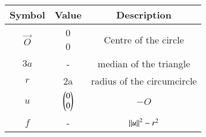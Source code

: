 \begin{tabular}[12pt]{ |c|c|c|}
    \hline
	\textbf{Symbol} & \textbf{Value} & \textbf{Description}\\
    \hline
	$\vec{O}$ &\myvec{0 \\ 0} & Centre of the circle\\
    \hline 
	$3a$ &- & median of the triangle \\
    \hline
	$r$ & 2a & radius of the circumcircle \\
    \hline
	$u$ & $\begin{pmatrix}0 \\ 0\end{pmatrix}$ & $-O$ \\
    \hline
        $f$ & - & ${\left\lVert u\right\rVert}^2 - {r}^2 $ \\
    \hline
    \end{tabular}
